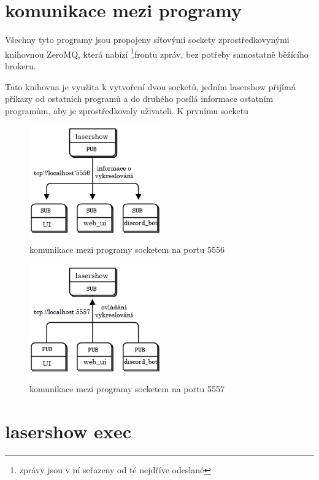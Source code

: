 \documentclass{template/socthesis}
\begin{document}
\section{komunikace mezi programy}
Všechny tyto programy jsou propojeny síťovými sockety zprostředkovynými knihovnou ZeroMQ, která nabízí \footnote{zprávy jsou v ní seřazeny od té nejdříve odeslané}{frontu} zpráv, bez potřeby samostatně běžícího brokeru.

Tato knihovna je využita k vytvoření dvou socketů, jedním lasershow přijímá příkazy od ostatních programů a do druhého posílá informace ostatním programům, aby je zprostředkovaly uživateli. K prvnímu socketu 

\begin{figure}[!htb]
  \centering
  \includegraphics[width=0.5\textwidth]{img/tcp5556.png}
  \caption{\label{fig:tcp5556}komunikace mezi programy socketem na portu 5556}
\end{figure}
\begin{figure}[!htb]
  \centering
  \includegraphics[width=0.5\textwidth]{img/tcp5557.png}
  \caption{\label{fig:tcp5557}komunikace mezi programy socketem na portu 5557}
\end{figure}

\section{lasershow exec}
\end{document}
